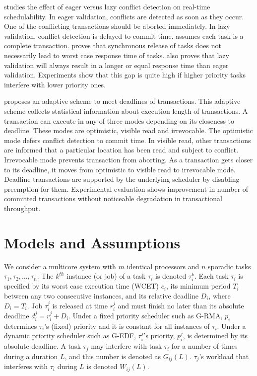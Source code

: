 \documentclass[12pt,english]{report}
\begin{document}
\cite{5665752} studies the effect of eager versus lazy conflict detection
on real-time schedulability. In eager validation, conflicts are detected
as soon as they occur. One of the conflicting transactions should
be aborted immediately. In lazy validation, conflict detection is
delayed to commit time. \cite{5665752} assumes each task is a complete
transaction. \cite{5665752} proves that synchronous release of tasks
does not necessarily lead to worst case response time of tasks. \cite{5665752}
also proves that lazy validation will always result in a longer or
equal response time than eager validation. Experiments show that this
gap is quite high if higher priority tasks interfere with lower priority
ones.

\cite{5958224}proposes an adaptive scheme to meet deadlines of transactions.
This adaptive scheme collects statistical information about execution
length of transactions. A transaction can execute in any of three
modes depending on its closeness to deadline. These modes are optimistic,
visible read and irrevocable. The optimistic mode defers conflict
detection to commit time. In visible read, other transactions are
informed that a particular location has been read and subject to conflict.
Irrevocable mode prevents transaction from aborting. As a transaction
gets closer to its deadline, it moves from optimistic to visible read
to irrevocable mode. Deadline transactions are supported by the underlying
scheduler by disabling preemption for them. Experimental evaluation
shows improvement in number of committed transactions without noticeable
degradation in transactional throughput.


\chapter{\label{models_assmuptions}Models and Assumptions}

We consider a multicore system with $m$ identical processors and $n$ sporadic tasks $\tau_1, \tau_2,\ldots, \tau_n$. The $k^{th}$ instance (or job) of a task $\tau_i$ is denoted $\tau_i^k$. Each task $\tau_i$ is specified by its worst case execution time (WCET) $c_i$, its minimum period $T_i$ between any two consecutive instances, and its relative deadline $D_i$, where $D_i=T_i$. Job $\tau_i^j$ is released at time $r_i^j$ and must finish no later than its absolute deadline $d_i^j=r_i^j+D_i$. Under a fixed priority scheduler such as G-RMA, $p_i$ determines $\tau_i$'s (fixed) priority and it is constant for all instances of $\tau_i$. Under a dynamic priority scheduler such as G-EDF, $\tau_i^j$'s priority, $p_i^j$, is determined by its absolute deadline. 
A task $\tau_j$ may interfere with task $\tau_i$ for a number of times during a duration $L$, and this number is denoted as $G_{ij}(L)$. 
$\tau_j$'s workload that interferes with $\tau_i$ during $L$ is denoted $W_{ij}(L)$.
\end{document}
